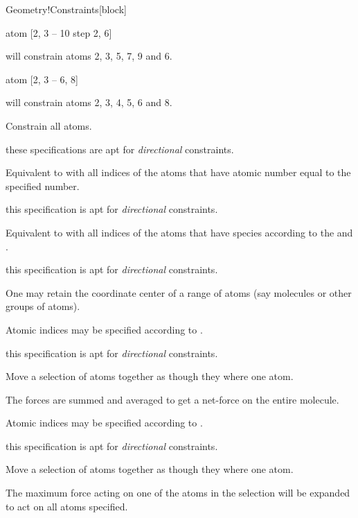 \begin{fdfentry}{Geometry!Constraints}[block]
\begin{fdfoptions}
\begin{fdfoptions}
      \begin{fdfexample}
        atom [2, 3 -- 10 step 2, 6]
      \end{fdfexample}
      will constrain atoms 2, 3, 5, 7, 9 and 6.

      \begin{fdfexample}
        atom [2, 3 -- 6, 8]
      \end{fdfexample}
      will constrain atoms 2, 3, 4, 5, 6 and 8.

      Constrain all atoms. 
      
    \end{fdfoptions}

    \note these specifications are apt for \emph{directional}
    constraints. 

    \option[Z]%
    Equivalent to  with all indices of the atoms that
    have atomic number equal to the specified number.

    \note this specification is apt for \emph{directional}
    constraints. 

    \option[species-i]%
    Equivalent to  with all indices of the atoms that
    have species according to the  and
    .

    \note this specification is apt for \emph{directional}
    constraints. 


    \option[center]%
    One may retain the coordinate center of a
    range of atoms (say molecules or other groups of atoms).

    Atomic indices may be specified according to .

    \note this specification is apt for \emph{directional}
    constraints. 


    Move a selection of atoms together as though they where one atom.

    The forces are summed and averaged to get a net-force on the
    entire molecule.

    Atomic indices may be specified according to .

    \note this specification is apt for \emph{directional}
    constraints. 


    Move a selection of atoms together as though they where one atom.

    The maximum force acting on one of the atoms in the selection will
    be expanded to act on all atoms specified.


\end{fdfoptions}
\end{fdfentry}
